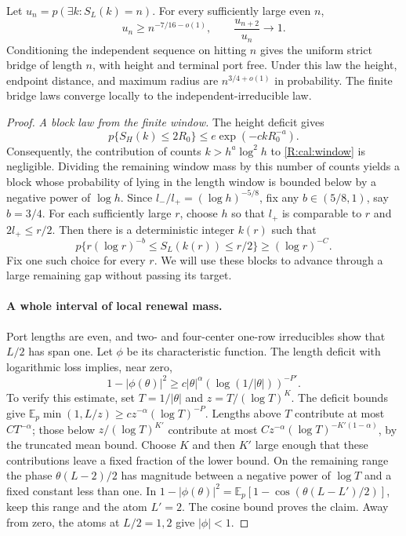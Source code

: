 \begin{theorem}
\label{R:cal:exact}
Let $u_n=p(\exists k:S_L(k)=n)$. For every sufficiently large even $n$,
\[
 u_n\ge n^{-7/16-o(1)},\qquad \frac{u_{n+2}}{u_n}\longrightarrow1.
\]
Conditioning the independent sequence on hitting $n$ gives the uniform
strict bridge of length $n$, with height and terminal port free. Under this
law the height, endpoint distance, and maximum radius are
$n^{3/4+o(1)}$ in probability. The finite bridge laws converge locally to
the independent-irreducible law.
\end{theorem}
\begin{proof}
\emph{A block law from the finite window.}
The height deficit gives
\[
 p\{S_H(k)\le2R_0\}\le e\exp(-c kR_0^{-a}).
\]
Consequently, the contribution of counts $k>h^a\log^2h$ to
\eqref{R:cal:window} is negligible. Dividing the remaining window mass by
this number of counts yields a block whose probability of lying in the
length window is bounded below by a negative power of $\log h$.
Since $l_-/l_+=(\log h)^{-5/8}$, fix any $b\in(5/8,1)$, say $b=3/4$.
For each sufficiently large $r$, choose $h$ so that $l_+$ is comparable
to $r$ and $2l_+\le r/2$. Then there is a deterministic integer $k(r)$
such that
\begin{equation}
 p\{r(\log r)^{-b}\le S_L(k(r))\le r/2\}
       \ge(\log r)^{-C}.
 \label{R:cal:landing}
\end{equation}
Fix one such choice for every $r$. We will use these blocks to advance
through a large remaining gap without passing its target.

\paragraph{A whole interval of local renewal mass.}
Port lengths are even, and two- and four-center one-row irreducibles show
that $L/2$ has span one. Let $\phi$ be its characteristic function. The
length deficit with logarithmic loss implies, near zero,
\[
 1-|\phi(\theta)|^2
       \ge c|\theta|^\alpha(\log(1/|\theta|))^{-P'}.
\]
To verify this estimate, set $T=1/|\theta|$ and
$z=T/(\log T)^K$. The deficit bounds give
$\mathbb E_p\min(1,L/z)\ge c z^{-\alpha}(\log T)^{-P}$.
Lengths above $T$ contribute at most $CT^{-\alpha}$; those below
$z/(\log T)^{K'}$ contribute at most
$Cz^{-\alpha}(\log T)^{-K'(1-\alpha)}$, by the truncated mean bound.
Choose $K$ and then $K'$ large enough that these contributions leave a
fixed fraction of the lower bound. On the remaining range the phase
$\theta(L-2)/2$ has magnitude between a negative power of $\log T$ and
a fixed constant less than one. In
$1-|\phi(\theta)|^2=\mathbb E_p[1-\cos(\theta(L-L')/2)]$,
keep this range and the atom $L'=2$. The cosine bound proves the claim.
Away from zero, the atoms at $L/2=1,2$ give $|\phi|<1$.


\end{proof}
